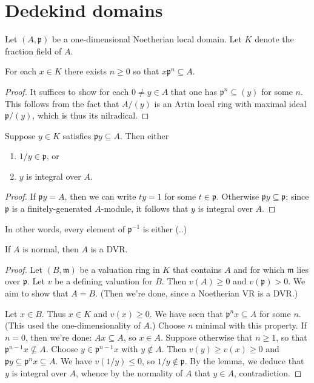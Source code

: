 \documentclass[reqno]{amsart}
\begin{document}
\section{Dedekind domains}
\label{sec:org0694603}

Let \((A,\mathfrak{p})\) be a one-dimensional Noetherian local
domain.  Let \(K\) denote the fraction field of \(A\).

\begin{lemma}
  For each $x \in K$ there exists $n \geq 0$ so that
  $x \mathfrak{p}^n \subseteq A$.
\end{lemma}
\begin{proof}
  It suffices to show for each $0 \neq y \in A$ that one has
  $\mathfrak{p}^n \subseteq (y)$ for some $n$.  This follows
  from the fact that $A/(y)$ is an Artin local ring with maximal
  ideal $\mathfrak{p}/(y)$, which is thus its nilradical.
\end{proof}

\begin{lemma}
  Suppose $y \in K$ satisfies
  $\mathfrak{p} y \subseteq A$.
  Then either
  \begin{enumerate}
  \item $1/y \in \mathfrak{p}$, or
  \item $y$ is integral over $A$.
  \end{enumerate}
\end{lemma}
\begin{proof}
  If $\mathfrak{p} y = A$,
  then we can write $t y = 1$ for some $t \in \mathfrak{p}$.
  Otherwise $\mathfrak{p} y \subseteq \mathfrak{p}$;
  since $\mathfrak{p}$ is a
  finitely-generated $A$-module, it follows that $y$ is integral over $A$.
\end{proof}
In other words, every element of \(\mathfrak{p}^{-1}\) is either (..)

\begin{theorem}
  If $A$ is normal, then $A$ is a DVR.
\end{theorem}
\begin{proof}
  Let $(B,\mathfrak{m})$ be a valuation ring in $K$ that
  contains $A$ and for which $\mathfrak{m}$ lies over
  $\mathfrak{p}$.  Let $v$ be a defining valuation for $B$.
  Then $v(A) \geq 0$ and $v(\mathfrak{p}) > 0$.  We aim to show
  that $A = B$.  (Then we're done, since a Noetherian VR is a
  DVR.)

  Let $x \in B$.  Thus $x \in K$ and $v(x) \geq 0$.  We have
  seen that $\mathfrak{p}^n x \subseteq A$ for some $n$.  (This
  used the one-dimensionality of $A$.)  Choose $n$ minimal with
  this property.  If $n = 0$, then we're done:
  $A x \subseteq A$, so $x \in A$.  Suppose otherwise that
  $n \geq 1$, so that $\mathfrak{p}^{n-1} x \not\subseteq A$.
  Choose $y \in \mathfrak{p}^{n-1} x$ with $y \notin A$.  Then
  $v(y) \geq v(x) \geq 0$ and
  $\mathfrak{p} y \subseteq \mathfrak{p}^n x \subseteq A$.  We
  have $v(1/y) \leq 0$, so $1/y \notin \mathfrak{p}$.  By the
  lemma, we deduce that $y$ is integral over $A$, whence by the
  normality of $A$ that $y \in A$, contradiction.
\end{proof}
\end{document}
